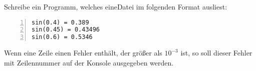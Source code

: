 \begin{aufg}
Schreibe ein Programm, welches eineDatei im folgenden Format ausliest:
\medskip \begin{codelisting}
\begin{lstlisting}[numbers=left,numberstyle=\tiny,frame=tlrb,mathescape=true]
sin(0.4) = 0.389
sin(0.45) = 0.43496
sin(0.6) = 0.5346
\end{lstlisting}
\end{codelisting}
Wenn eine Zeile einen Fehler enthält, der größer als $10^{-3}$ ist, so soll dieser Fehler mit Zeilennummer auf der Konsole ausgegeben werden.
\end{aufg}
